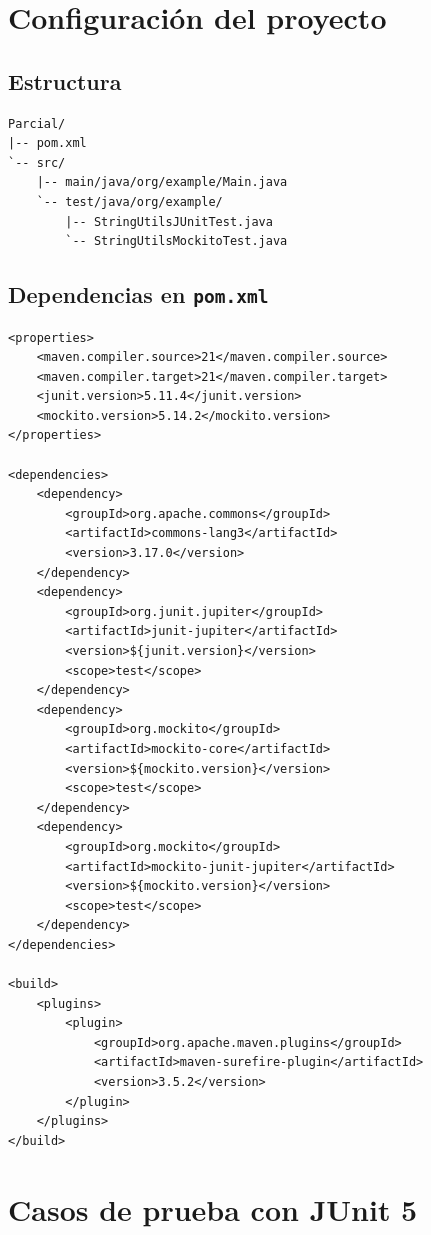 \documentclass{article}
\begin{document}
\section{Configuraci\'on del proyecto}

\subsection{Estructura}
\begin{verbatim}
Parcial/
|-- pom.xml
`-- src/
    |-- main/java/org/example/Main.java
    `-- test/java/org/example/
        |-- StringUtilsJUnitTest.java
        `-- StringUtilsMockitoTest.java
\end{verbatim}

\subsection{Dependencias en \texttt{pom.xml}}
\begin{verbatim}
<properties>
    <maven.compiler.source>21</maven.compiler.source>
    <maven.compiler.target>21</maven.compiler.target>
    <junit.version>5.11.4</junit.version>
    <mockito.version>5.14.2</mockito.version>
</properties>

<dependencies>
    <dependency>
        <groupId>org.apache.commons</groupId>
        <artifactId>commons-lang3</artifactId>
        <version>3.17.0</version>
    </dependency>
    <dependency>
        <groupId>org.junit.jupiter</groupId>
        <artifactId>junit-jupiter</artifactId>
        <version>${junit.version}</version>
        <scope>test</scope>
    </dependency>
    <dependency>
        <groupId>org.mockito</groupId>
        <artifactId>mockito-core</artifactId>
        <version>${mockito.version}</version>
        <scope>test</scope>
    </dependency>
    <dependency>
        <groupId>org.mockito</groupId>
        <artifactId>mockito-junit-jupiter</artifactId>
        <version>${mockito.version}</version>
        <scope>test</scope>
    </dependency>
</dependencies>

<build>
    <plugins>
        <plugin>
            <groupId>org.apache.maven.plugins</groupId>
            <artifactId>maven-surefire-plugin</artifactId>
            <version>3.5.2</version>
        </plugin>
    </plugins>
</build>
\end{verbatim}

\newpage
\section{Casos de prueba con JUnit 5}
\end{document}
